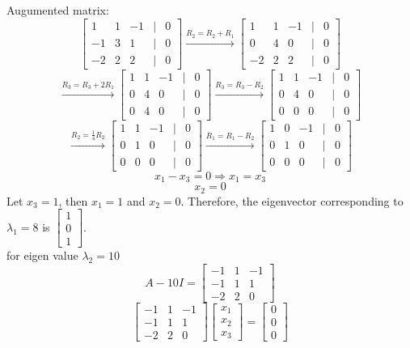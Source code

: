 \documentclass[12pt]{extarticle} %
\begin{document}
\begin{enumerate}
\[    \]
    Augumented matrix:
    \[
    \begin{bmatrix} 1 & 1 & -1 & | & 0\\ -1 & 3 & 1 & | & 0 \\ -2 & 2 & 2 & | & 0 \end{bmatrix} \xrightarrow{R_2 = R_2 + R_1} \begin{bmatrix} 1 & 1 & -1 & | & 0\\ 0 & 4 & 0 & | & 0 \\ -2 & 2 & 2 & | & 0 \end{bmatrix}
    \]
    \[
    \xrightarrow{R_3 = R_3 + 2R_1} \begin{bmatrix} 1 & 1 & -1 & | & 0\\ 0 & 4 & 0 & | & 0 \\ 0 & 4 & 0 & | & 0 \end{bmatrix} \xrightarrow{R_3 = R_3 - R_2} \begin{bmatrix} 1 & 1 & -1 & | & 0\\ 0 & 4 & 0 & | & 0 \\ 0 & 0 & 0 & | & 0 \end{bmatrix}
    \]
    \[
    \xrightarrow{R_2 = \frac{1}{4}R_2} \begin{bmatrix} 1 & 1 & -1 & | & 0\\ 0 & 1 & 0 & | & 0 \\ 0 & 0 & 0 & | & 0 \end{bmatrix} \xrightarrow{R_1 = R_1 - R_2} \begin{bmatrix} 1 & 0 & -1 & | & 0\\ 0 & 1 & 0 & | & 0 \\ 0 & 0 & 0 & | & 0 \end{bmatrix}
    \]
    \[
    x_1 - x_3 = 0 \Rightarrow x_1 = x_3
    \]
    \[
    x_2 = 0
    \]
    Let $x_3 = 1$, then $x_1 = 1$ and $x_2 = 0$. Therefore, the eigenvector corresponding to $\lambda_1 = 8$ is $\begin{bmatrix} 1 \\ 0 \\ 1 \end{bmatrix}$.
    \\ for eigen value $\lambda_2 = 10$
    \[
    A - 10I = \begin{bmatrix} -1 & 1 & -1\\ -1 & 1 & 1 \\ -2 & 2 & 0 \end{bmatrix}
    \]
    \[
    \begin{bmatrix} -1 & 1 & -1\\ -1 & 1 & 1 \\ -2 & 2 & 0 \end{bmatrix} \begin{bmatrix} x_1 \\ x_2 \\ x_3 \end{bmatrix} = \begin{bmatrix} 0 \\ 0 \\ 0 \end{bmatrix}
\]
\end{enumerate}
\end{document}
